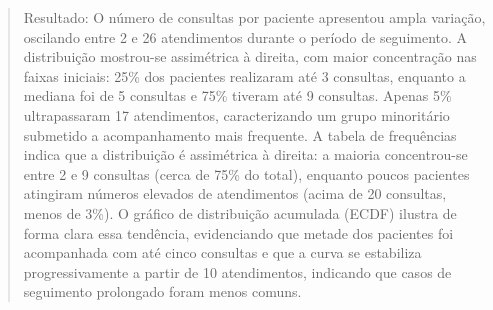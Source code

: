 \documentclass[
]{article}
\begin{document}
\begin{quote}
Resultado: O número de consultas por paciente apresentou ampla variação,
oscilando entre 2 e 26 atendimentos durante o período de seguimento. A
distribuição mostrou-se assimétrica à direita, com maior concentração
nas faixas iniciais: 25\% dos pacientes realizaram até 3 consultas,
enquanto a mediana foi de 5 consultas e 75\% tiveram até 9 consultas.
Apenas 5\% ultrapassaram 17 atendimentos, caracterizando um grupo
minoritário submetido a acompanhamento mais frequente. A tabela de
frequências indica que a distribuição é assimétrica à direita: a maioria
concentrou-se entre 2 e 9 consultas (cerca de 75\% do total), enquanto
poucos pacientes atingiram números elevados de atendimentos (acima de 20
consultas, menos de 3\%). O gráfico de distribuição acumulada (ECDF)
ilustra de forma clara essa tendência, evidenciando que metade dos
pacientes foi acompanhada com até cinco consultas e que a curva se
estabiliza progressivamente a partir de 10 atendimentos, indicando que
casos de seguimento prolongado foram menos comuns.
\end{quote}
\end{document}
